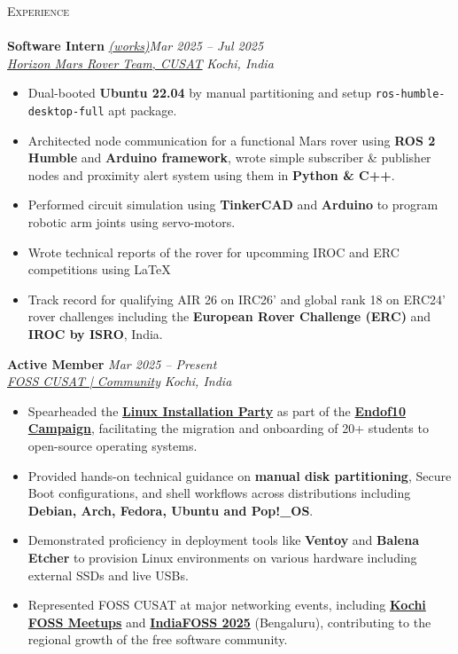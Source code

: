 \documentclass[a4paper]{article}
\newcommand{\lineunder} {
    \vspace*{-8pt} \\
    \hspace*{-18pt} \hrulefill \\
}
\newcommand{\header} [1] {
    {\hspace*{-18pt}\vspace*{6pt} \textsc{#1}}
    \vspace*{-6pt} \lineunder
}
\begin{document}
\header{Experience}
\textbf{Software Intern} \href{https://github.com/aaromalonline/aaromalanil_horizon_s2}{\textit{(works)}}\hfill \textit{Mar 2025 -- Jul 2025} \\
\textit{\href{https://roverchallenge.eu/team/horizon-2024/}{Horizon Mars Rover Team, CUSAT}} \hfill \textit{Kochi, India}
\begin{itemize}
    \item Dual-booted \textbf{Ubuntu 22.04} by manual partitioning and setup \texttt{ros-humble-desktop-full} apt package.
    \item Architected node communication for a functional Mars rover using \textbf{ROS 2 Humble} and \textbf{Arduino framework}, wrote simple subscriber \& publisher nodes and proximity alert system using them in \textbf{Python \& C++}.
    \item Performed circuit simulation using \textbf{TinkerCAD} and \textbf{Arduino} to program robotic arm joints using servo-motors.
    \item Wrote technical reports of the rover for upcomming IROC and ERC competitions using \LaTeX\
    \item Track record for qualifying AIR 26 on IRC26' and global rank 18 on ERC24' rover challenges including the \textbf{European Rover Challenge (ERC)} and \textbf{IROC by ISRO}, India.
\end{itemize}

\textbf{Active Member} \hfill \textit{Mar 2025 -- Present} \\
\textit{\href{https://fossunited.org/c/school-of-engineering-cusat}{FOSS CUSAT | Community}} \hfill \textit{Kochi, India}
\begin{itemize}
    \item Spearheaded the \textbf{\href{https://www.linkedin.com/posts/aaromalonline_endof10-foss-activity-7418182178624126976-I1s4?}{Linux Installation Party}} as part of the \textbf{\href{https://endof10.org/}{Endof10 Campaign}}, facilitating the migration and onboarding of 20+ students to open-source operating systems.
    \item Provided hands-on technical guidance on \textbf{manual disk partitioning}, Secure Boot configurations, and shell workflows across distributions including \textbf{Debian, Arch, Fedora, Ubuntu and Pop!\_OS}.
    \item Demonstrated proficiency in deployment tools like \textbf{Ventoy} and \textbf{Balena Etcher} to provision Linux environments on various hardware including external SSDs and live USBs.
    \item Represented FOSS CUSAT at major networking events, including \textbf{\href{https://kochifoss.org/}{Kochi FOSS Meetups}} and \textbf{\href{https://fossunited.org/indiafoss/2025}{IndiaFOSS 2025}} (Bengaluru), contributing to the regional growth of the free software community.
\end{itemize}
\end{document}
